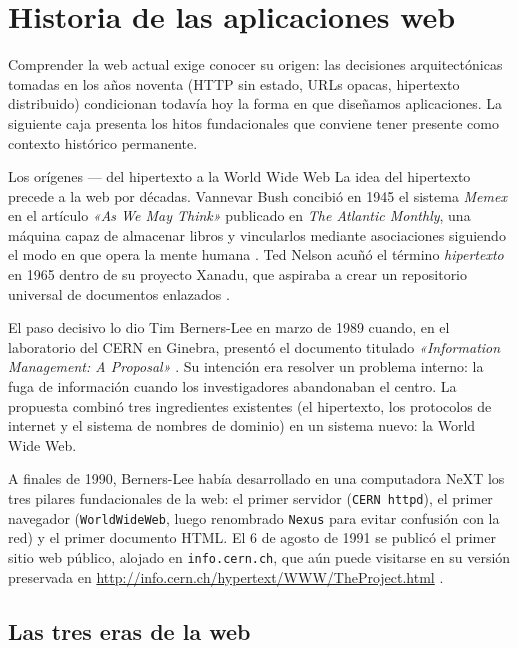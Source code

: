 \section{Historia de las aplicaciones web}

Comprender la web actual exige conocer su origen: las decisiones arquitectónicas tomadas en los años noventa (HTTP sin estado, URLs opacas, hipertexto distribuido) condicionan todavía hoy la forma en que diseñamos aplicaciones. La siguiente caja presenta los hitos
fundacionales que conviene tener presente como contexto histórico permanente.


\begin{cajahistoria}{Los orígenes --- del hipertexto a la World Wide Web} La idea del hipertexto precede a la web por décadas. Vannevar Bush
concibió en 1945 el sistema \emph{Memex} en el artículo \emph{«As We
May Think»} publicado en \emph{The Atlantic Monthly}, una máquina
capaz de almacenar libros y vincularlos mediante asociaciones
siguiendo el modo en que opera la mente humana \cite{bush1945memex}.
Ted Nelson acuñó el término \emph{hipertexto} en 1965 dentro de su
proyecto Xanadu, que aspiraba a crear un repositorio universal de
documentos enlazados \cite{nelson1965xanadu}.

El paso decisivo lo dio Tim Berners-Lee en marzo de 1989 cuando, en el
laboratorio del CERN en Ginebra, presentó el documento titulado
\emph{«Information Management: A Proposal»} \cite{bernerslee1989}. Su
intención era resolver un problema interno: la fuga de información
cuando los investigadores abandonaban el centro. La propuesta combinó
tres ingredientes existentes (el hipertexto, los protocolos de internet
y el sistema de nombres de dominio) en un sistema nuevo: la World Wide
Web.

A finales de 1990, Berners-Lee había desarrollado en una computadora
NeXT los tres pilares fundacionales de la web: el primer servidor
(\texttt{CERN httpd}), el primer navegador (\texttt{WorldWideWeb},
luego renombrado \texttt{Nexus} para evitar confusión con la red) y el
primer documento HTML. El 6 de agosto de 1991 se publicó el primer
sitio web público, alojado en \texttt{info.cern.ch}, que aún puede
visitarse en su versión preservada en
\url{http://info.cern.ch/hypertext/WWW/TheProject.html}
\cite{cern1991firstsite}.
\end{cajahistoria}

\subsection{Las tres eras de la web}

